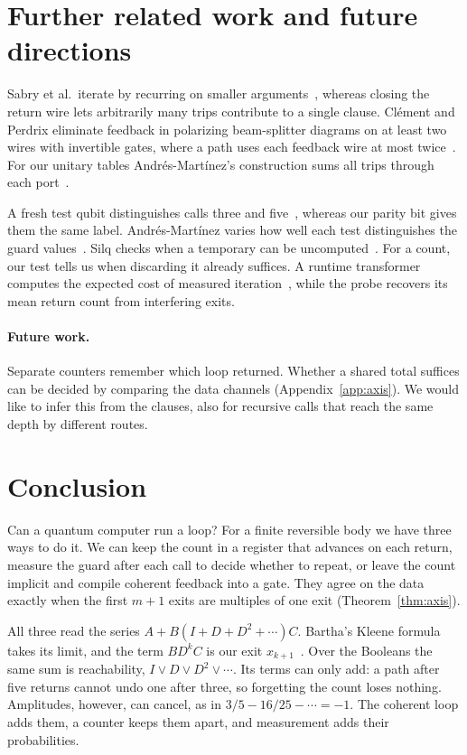 \documentclass[acmsmall,screen,review,anonymous,nonacm]{acmart}
\numberwithin{equation}{section}
\begin{document}
\section{Further related work and future directions}
Sabry et al.\ iterate by recurring on smaller arguments~\cite{SabryValironVizzotto18}, whereas closing the return wire lets arbitrarily many trips contribute to a single clause. Cl\'ement and Perdrix eliminate feedback in polarizing beam-splitter diagrams on at least two wires with invertible gates, where a path uses each feedback wire at most twice~\cite[Prop.~26]{ClementPerdrix20PBS}. For our unitary tables Andr\'es-Mart\'inez's construction sums all trips through each port~\cite[Thm.~3.3.15]{AndresMartinez22Thesis}.

A fresh test qubit distinguishes calls three and five~\cite[Fig.~2 and \S~4]{AssoliniDiPierro25Loops}, whereas our parity bit gives them the same label. Andr\'es-Mart\'inez varies how well each test distinguishes the guard values~\cite[\S~4.2]{AndresMartinez22Thesis}. Silq checks when a temporary can be uncomputed~\cite{Silq20}. For a count, our test tells us when discarding it already suffices. A runtime transformer computes the expected cost of measured iteration~\cite{OlmedoDiazCaro19}, while the probe recovers its mean return count from interfering exits.

\paragraph{Future work.}
Separate counters remember which loop returned. Whether a shared total suffices can be decided by comparing the data channels (Appendix~\ref{app:axis}). We would like to infer this from the clauses, also for recursive calls that reach the same depth by different routes.

\section{Conclusion}
Can a quantum computer run a loop? For a finite reversible body we have three ways to do it. We can keep the count in a register that advances on each return, measure the guard after each call to decide whether to repeat, or leave the count implicit and compile coherent feedback into a gate. They agree on the data exactly when the first $m+1$ exits are multiples of one exit (Theorem~\ref{thm:axis}).

All three read the series $A+B(I+D+D^2+\cdots)C$. Bartha's Kleene formula takes its limit, and the term $BD^kC$ is our exit $x_{k+1}$~\cite[Eq.~(1)]{Bartha14QuantumTuringAutomata}. Over the Booleans the same sum is reachability, $I\lor D\lor D^2\lor\cdots$. Its terms can only add: a path after five returns cannot undo one after three, so forgetting the count loses nothing. Amplitudes, however, can cancel, as in $3/5-16/25-\cdots=-1$. The coherent loop adds them, a counter keeps them apart, and measurement adds their probabilities.
\end{document}
